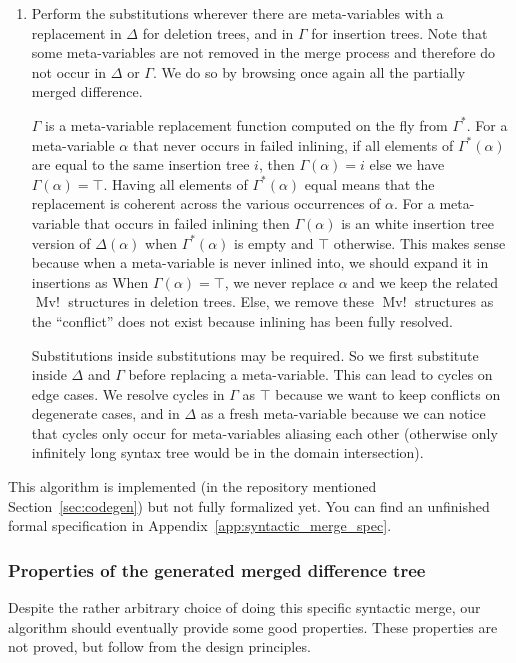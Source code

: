 \documentclass[a4paper,11pt]{article}
\DeclareMathOperator\MvConflict{Mv!}
\begin{document}
\begin{enumerate}
 \item Perform the substitutions wherever there are meta-variables with a replacement in $\Delta$ for deletion trees, and in $\Gamma$ for insertion trees. Note that some meta-variables are not removed in the merge process and therefore do not occur in $\Delta$ or $\Gamma$. We do so by browsing once again all the partially merged difference.
 
 $\Gamma$ is a meta-variable replacement function computed on the fly from $\Gamma^*$. For a meta-variable $\alpha$ that never occurs in failed inlining, if all elements of $\Gamma^*(\alpha)$ are equal to the same insertion tree $i$, then $\Gamma(\alpha) = i$ else we have $\Gamma(\alpha) = \top$. Having all elements of $\Gamma^*(\alpha)$ equal means that the replacement is coherent across the various occurrences of $\alpha$. For a meta-variable that occurs in failed inlining then $\Gamma(\alpha)$ is an white insertion tree version of $\Delta(\alpha)$ when $\Gamma^*(\alpha)$ is empty and $\top$ otherwise. This makes sense because when a meta-variable is never inlined into, we should expand it in insertions as 
 When $\Gamma(\alpha) = \top$, we never replace $\alpha$ and we keep the related $\MvConflict$ structures in deletion trees. Else, we remove these $\MvConflict$ structures as the ``conflict'' does not exist because inlining has been fully resolved.
 
 Substitutions inside substitutions may be required. So we first substitute inside $\Delta$ and $\Gamma$ before replacing a meta-variable. This can lead to cycles on edge cases. We resolve cycles in $\Gamma$ as $\top$ because we want to keep conflicts on degenerate cases, and in $\Delta$ as a fresh meta-variable because we can notice that cycles only occur for meta-variables aliasing each other (otherwise only infinitely long syntax tree would be in the domain intersection).
\end{enumerate}

This algorithm is implemented (in the repository mentioned Section~\ref{sec:codegen}) but not fully formalized yet. You can find an unfinished formal specification in Appendix~\ref{app:syntactic_merge_spec}.

\subsubsection{Properties of the generated merged difference tree}
\label{sec:merge_properties}
Despite the rather arbitrary choice of doing this specific syntactic
merge, our algorithm should eventually provide some good
properties. These properties are not proved, but follow from the design principles.
\end{document}

